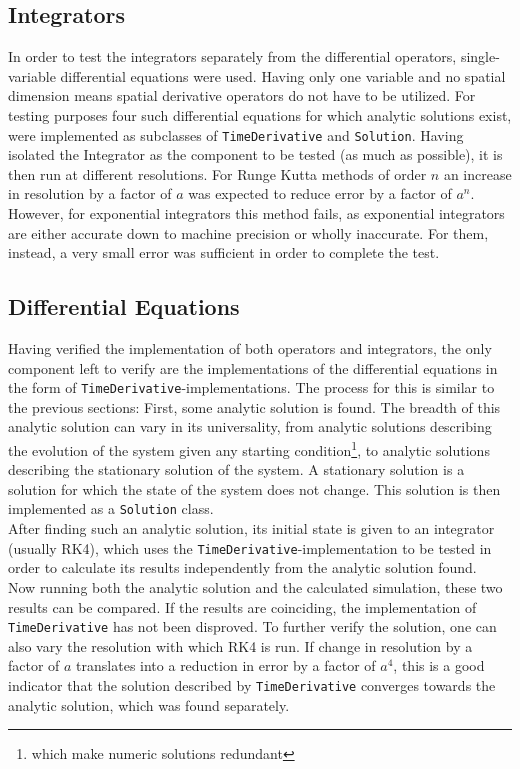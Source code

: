 \subsection{Integrators}
In order to test the integrators separately from the differential operators, single-variable differential equations were used.
Having only one variable and no spatial dimension means spatial derivative operators do not have to be utilized.
For testing purposes four such differential equations for which analytic solutions exist, were implemented as subclasses of  \texttt{TimeDerivative} and \texttt{Solution}.
Having isolated the Integrator as the component to be tested (as much as possible), it is then run at different resolutions.
For Runge Kutta methods of order $n$ an increase in resolution by a factor of $a$ was expected to reduce error by a factor of $a^n$.
However, for exponential integrators this method fails, as exponential integrators are either accurate down to machine precision or wholly inaccurate.
For them, instead, a very small error was sufficient in order to complete the test.

\subsection{Differential Equations}
Having verified the implementation of both operators and integrators, the only component left to verify are the implementations of the differential equations in the form of \texttt{TimeDerivative}-implementations.
The process for this is similar to the previous sections: First, some analytic solution is found.
The breadth of this analytic solution can vary in its universality, from analytic solutions describing the evolution of the system given any starting condition\footnote{which make numeric solutions redundant}, to analytic solutions describing the stationary solution of the system.
A stationary solution is a solution for which the state of the system does not change.
This solution is then implemented as a \texttt{Solution} class.
\\
After finding such an analytic solution, its initial state is given to an integrator (usually RK4), which uses the \texttt{TimeDerivative}-implementation to be tested in order to calculate its results independently from the analytic solution found.
\\
Now running both the analytic solution and the calculated simulation, these two results can be compared.
If the results are coinciding, the implementation of \texttt{TimeDerivative} has not been disproved.
To further verify the solution, one can also vary the resolution with which RK4 is run.
If change in resolution by a factor of $a$ translates into a reduction in error by a factor of $a^4$, this is a good indicator that the solution described by \texttt{TimeDerivative} converges towards the analytic solution, which was found separately.

